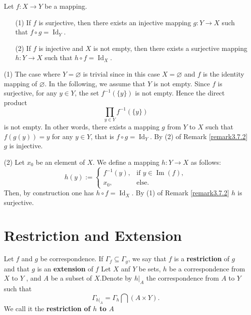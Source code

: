 \documentclass{book}
\numberwithin{equation}{section}
\begin{document}
\begin{propositionenv}
\label{prop:direct-product-factorization}
Let $f : X \to Y$ be a mapping.
\begin{enumerate}
    \item[(1)] If $f$ is surjective,  then there exists an injective mapping $g : Y \to X$ such that $f \circ g = \operatorname{Id}_Y$.
    \item[(2)] If $f$ is injective and $X$ is not empty,  then there exists a surjective mapping $h : Y \to X$ such that $h \circ f = \operatorname{Id}_X$.
\end{enumerate}
\end{propositionenv}

\begin{proofenv}
(1) The case where $Y = \varnothing$ is trivial since in this case $X = \varnothing$ and $f$ is the identity mapping of $\varnothing$. In the following,  we assume that $Y$ is not empty. Since $f$ is surjective,  for any $y \in Y$,  the set $f^{-1}(\{y\})$ is not empty. Hence the direct product
\[
\prod_{y \in Y} f^{-1}(\{y\})
\]
is not empty. In other words,  there exists a mapping $g$ from $Y$ to $X$ such that $f(g(y)) = y$ for any $y \in Y$,  that is $f \circ g = \operatorname{Id}_Y$. By (2) of Remark \ref{remark3.7.2} $g$ is injective.

(2) Let $x_0$ be an element of $X$. We define a mapping $h : Y \to X$ as follows:
\[
h(y) := 
\begin{cases}
f^{-1}(y),  & \text{if } y \in \operatorname{Im}(f),  \\
x_0,  & \text{else}.
\end{cases}
\]
Then,  by construction one has $h \circ f = \operatorname{Id}_X$. 
\newline
By (1) of Remark \ref{remark3.7.2} $h$ is surjective.
\end{proofenv}
\section{Restriction and Extension}
\begin{definitionenv}
    Let $f$ and $g$ be correspondence. If $\Gamma _f\subseteq \Gamma _g$,  we say that $f$ is a \textbf{restriction} of $g$ and that $g$ is an \textbf{extension} of $f$
    \newline
    Let $X$ anf $Y$ be sets,  $h$ be a correspondence from $X$ to $Y$ , and $A$ be a subset of $X$.Denote by $h|_A$ the correspondence from $A$ to $Y$ such that$$\Gamma_{h|_A}=\Gamma_h\bigcap (A\times Y).$$ We call it the \textbf{restriction of $h$ to $A$}
\end{definitionenv}
\end{document}

